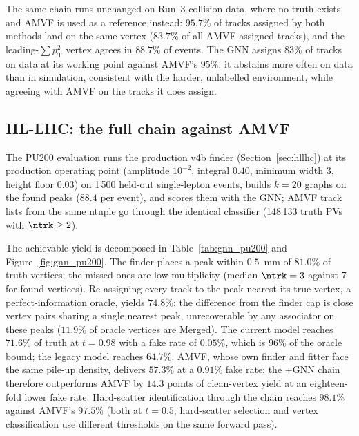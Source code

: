 The same chain runs unchanged on Run~3 collision data, where no truth exists
and AMVF is used as a reference instead: $95.7\%$ of tracks assigned by both
methods land on the same vertex ($83.7\%$ of all AMVF-assigned tracks), and
the leading-$\sum p_{\mathrm{T}}^{2}$ vertex agrees in $88.7\%$ of events.
The GNN assigns $83\%$ of tracks on data at its working point against
AMVF's $95\%$: it abstains more often on data than in simulation,
consistent with the harder, unlabelled environment, while agreeing with
AMVF on the tracks it does assign.

\subsection{HL-LHC: the full chain against AMVF}
\label{sec:gnn:pu200}

The PU200 evaluation runs the production v4b finder (Section~\ref{sec:hllhc})
at its production operating point (amplitude $10^{-2}$, integral $0.40$,
minimum width 3, height floor $0.03$) on 1\,500 held-out single-lepton events,
builds $k=20$ graphs on the found peaks ($88.4$ per event), and scores them
with the GNN; AMVF track lists from the same ntuple go through the identical
classifier (148\,133 truth PVs with $\ntrk\geq2$).

The achievable yield is decomposed in Table~\ref{tab:gnn_pu200} and
Figure~\ref{fig:gnn_pu200}. The finder places a
peak within $0.5$~mm of $81.0\%$ of truth vertices; the missed ones are
low-multiplicity (median $\ntrk=3$ against $7$ for found vertices).
Re-assigning every track to the peak nearest its true vertex, a
perfect-information oracle, yields $74.8\%$: the difference from the finder
cap is close vertex pairs sharing a single nearest peak, unrecoverable by any
associator on these peaks ($11.9\%$ of oracle vertices are Merged). The
current model reaches $\mathbf{71.6\%}$ of truth at $t=0.98$ with a fake rate
of $0.05\%$, which is $96\%$ of the oracle bound; the legacy model reaches
$64.7\%$. AMVF, whose own finder and fitter face the same pile-up density,
delivers $57.3\%$ at a $0.91\%$ fake rate; the \pvf{}+GNN chain therefore
outperforms AMVF by $14.3$ points of clean-vertex yield at an eighteen-fold
lower fake rate. Hard-scatter identification through the chain reaches
$98.1\%$ against AMVF's $97.5\%$ (both at $t=0.5$; hard-scatter selection
and vertex classification use different thresholds on the same forward
pass).

